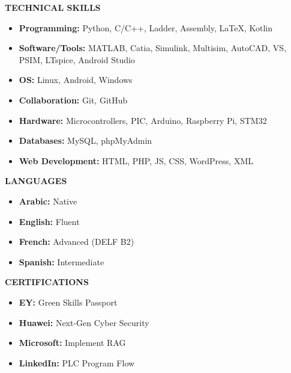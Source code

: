 \documentclass{article}
\begin{document}
\begin{minipage}[t]{0.3\textwidth}
\raggedright
{\color{sectionteal}\large\bfseries TECHNICAL SKILLS} \\[0.05em]
\begin{itemize}[leftmargin=*, noitemsep, topsep=0pt, partopsep=0pt, parsep=0pt]
\item \textbf{Programming:} Python, C/C++, Ladder, Assembly, LaTeX, Kotlin \\[0.5em]
\item \textbf{Software/Tools:} MATLAB, Catia, Simulink, Multisim, AutoCAD, VS, PSIM, LTspice, Android Studio \\[0.5em]
\item \textbf{OS:} Linux, Android, Windows \\[0.5em]
\item \textbf{Collaboration:} Git, GitHub \\[0.5em]
\item \textbf{Hardware:} Microcontrollers, PIC, Arduino, Raspberry Pi, STM32 \\[0.5em]
\item \textbf{Databases:} MySQL, phpMyAdmin \\[0.5em]
\item \textbf{Web Development:} HTML, PHP, JS, CSS, WordPress, XML
\end{itemize}

\vspace{1.5em}
{\color{sectionteal}\large\bfseries LANGUAGES} \\[0.05em]
\begin{itemize}[leftmargin=*, noitemsep, topsep=0pt, partopsep=0pt, parsep=0pt]
\item \textbf{Arabic:} Native \\[0.5em]
\item \textbf{English:} Fluent \\[0.5em]
\item \textbf{French:} Advanced (DELF B2) \\[0.5em]
\item \textbf{Spanish:} Intermediate
\end{itemize}

\vspace{1.5em}
{\color{sectionteal}\large\bfseries CERTIFICATIONS} \\[0.05em]
\begin{itemize}[leftmargin=*, noitemsep, topsep=0pt, partopsep=0pt, parsep=0pt]
\item \textbf{EY:} Green Skills Passport \\[0.5em]
\item \textbf{Huawei:} Next-Gen Cyber Security \\[0.5em]
\item \textbf{Microsoft:} Implement RAG \\[0.5em]
\item \textbf{LinkedIn:} PLC Program Flow
\end{itemize}


\end{minipage}
\end{document}
